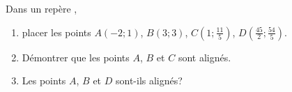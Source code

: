 
Dans un repère \Oij,
\begin{enumerate}
\item placer les points $A(-2;1)$, $B(3;3)$, $C\left(1;\frac{11}{5}\right)$, $D\left(\frac{45}{2};\frac{54}{5}\right)$.
\item Démontrer que les points $A$, $B$ et $C$ sont alignés.
\item Les points $A$, $B$ et $D$ sont-ils alignés?
\end{enumerate}
